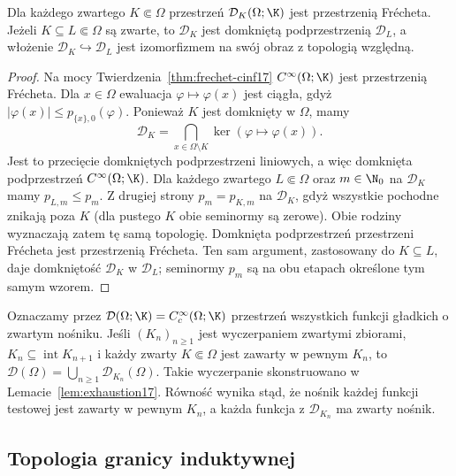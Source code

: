 \begin{twierdzenie}
\label{thm:DK-frechet18}
Dla każdego zwartego $K\Subset\Omega$ przestrzeń
$\mathcal D_K(\Omega;\K)$ jest przestrzenią Fr\'echeta.
Jeżeli $K\subseteq L\Subset\Omega$ są zwarte, to
$\mathcal D_K$ jest domkniętą podprzestrzenią $\mathcal D_L$,
a włożenie $\mathcal D_K\hookrightarrow\mathcal D_L$
jest izomorfizmem na swój obraz z topologią względną.
\end{twierdzenie}
\begin{proof}
Na mocy Twierdzenia~\ref{thm:frechet-cinf17}
$C^\infty(\Omega;\K)$ jest przestrzenią Frécheta.
Dla $x\in\Omega$ ewaluacja $\varphi\mapsto\varphi(x)$
jest ciągła, gdyż $|\varphi(x)|\le p_{\{x\},0}(\varphi)$.
Ponieważ $K$ jest domknięty w $\Omega$, mamy
\[
\mathcal D_K=\bigcap_{x\in\Omega\setminus K}
\ker(\varphi\mapsto\varphi(x)).
\]
Jest to przecięcie domkniętych podprzestrzeni liniowych,
a więc domknięta podprzestrzeń $C^\infty(\Omega;\K)$.
Dla każdego zwartego $L\Subset\Omega$ oraz $m\in\N_0$
na $\mathcal D_K$ mamy $p_{L,m}\le p_m$.
Z drugiej strony $p_m=p_{K,m}$ na $\mathcal D_K$,
gdyż wszystkie pochodne znikają poza $K$
(dla pustego $K$ obie seminormy są zerowe).
Obie rodziny wyznaczają zatem tę samą topologię.
Domknięta podprzestrzeń przestrzeni Fr\'echeta jest przestrzenią
Fr\'echeta. Ten sam argument, zastosowany do $K\subseteq L$,
daje domkniętość $\mathcal D_K$ w $\mathcal D_L$;
seminormy $p_m$ są na obu etapach określone tym samym wzorem.
\end{proof}

\begin{definicja}
\label{def:D-algebraic18}
Oznaczamy przez $\mathcal D(\Omega;\K)=C_c^\infty(\Omega;\K)$
przestrzeń wszystkich funkcji gładkich o zwartym nośniku.
Jeśli $(K_n)_{n\ge1}$ jest wyczerpaniem zwartymi zbiorami,
$K_n\subseteq\operatorname{int}K_{n+1}$ i każdy zwarty
$K\Subset\Omega$ jest zawarty w pewnym $K_n$, to
$\mathcal D(\Omega)=\bigcup_{n\ge1}\mathcal D_{K_n}(\Omega)$.
Takie wyczerpanie skonstruowano w Lemacie~\ref{lem:exhaustion17}.
Równość wynika stąd, że nośnik każdej funkcji testowej
jest zawarty w pewnym $K_n$, a każda funkcja z $\mathcal D_{K_n}$
ma zwarty nośnik.
\end{definicja}

\subsection{Topologia granicy induktywnej}

